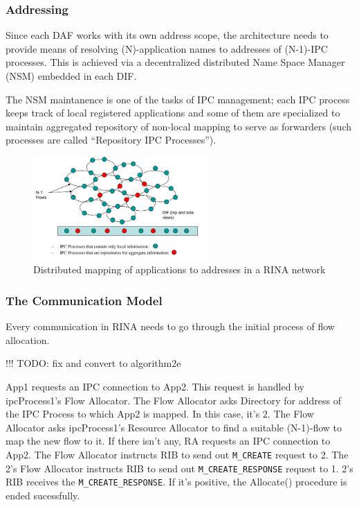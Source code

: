             \subsubsection{Addressing}

                Since each DAF works with its own address scope, the architecture needs to provide means of resolving (N)-application names to addresses of (N-1)-IPC processes. This is achieved via a decentralized distributed Name Space Manager (NSM) embedded in each DIF.

                The NSM maintanence is one of the tasks of IPC management; each IPC process keeps track of local registered applications and some of them are specialized to maintain aggregated repository of non-local mapping to serve as forwarders (such processes are called ``Repository IPC Processes'').

                \begin{figure}[H]
                    \begin{center}
                        \includegraphics[width=0.6\textwidth]{fig/archs_rina-nsm.png}
                      \caption{Distributed mapping of applications to addresses in a RINA network}
                      \label{fig:rina_nsm}
                    \end{center}
                \end{figure}


            \subsubsection{The Communication Model}\label{archs:rina:communication}

                Every communication in RINA needs to go through the initial process of flow allocation.

                !!! TODO: fix and convert to algorithm2e

                App1 requests an IPC connection to App2. This request is handled by ipcProcess1's Flow Allocator.
                The Flow Allocator asks Directory for address of the IPC Process to which App2 is mapped. In this case, it's 2.
                The Flow Allocator asks ipcProcess1's Resource Allocator to find a suitable (N-1)-flow to map the new flow to it. If there isn't any, RA requests an IPC connection to App2.
                The Flow Allocator instructs RIB to send out \texttt{M\_CREATE} request to 2.
                The 2's Flow Allocator instructs RIB to send out \texttt{M\_CREATE\_RESPONSE} request to 1.
                2's RIB receives the \texttt{M\_CREATE\_RESPONSE}. If it's positive, the Allocate() procedure is ended sucessfully.

